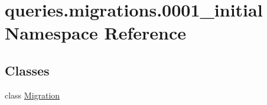 \hypertarget{namespacequeries_1_1migrations_1_10001__initial}{\section{queries.\-migrations.0001\-\_\-initial Namespace Reference}
\label{namespacequeries_1_1migrations_1_10001__initial}
}
\subsection*{Classes}
\begin{DoxyCompactItemize}
\item 
class \hyperlink{classqueries_1_1migrations_1_10001__initial_1_1_migration}{Migration}
\end{DoxyCompactItemize}
